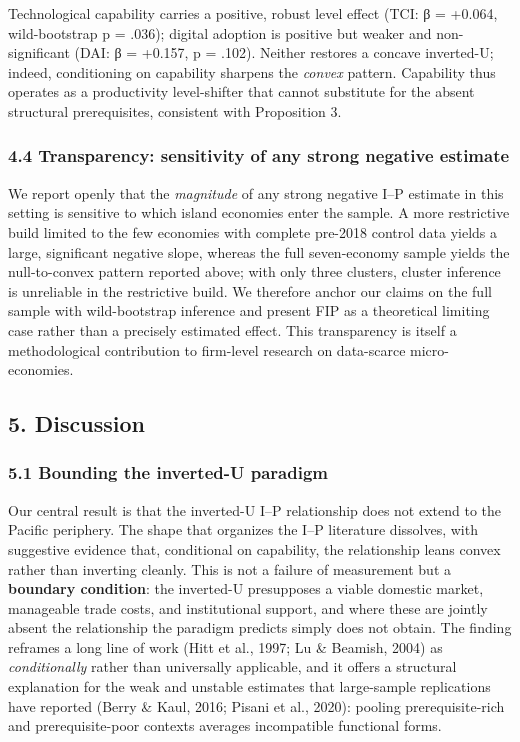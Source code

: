 \documentclass[
  12pt,a4paper]{article}
\begin{document}
Technological capability carries a positive, robust level effect (TCI: β
= +0.064, wild-bootstrap p = .036); digital adoption is positive but
weaker and non-significant (DAI: β = +0.157, p = .102). Neither restores
a concave inverted-U; indeed, conditioning on capability sharpens the
\emph{convex} pattern. Capability thus operates as a productivity
level-shifter that cannot substitute for the absent structural
prerequisites, consistent with Proposition 3.

\hypertarget{transparency-sensitivity-of-any-strong-negative-estimate}{%
\subsubsection{4.4 Transparency: sensitivity of any strong negative
estimate}\label{transparency-sensitivity-of-any-strong-negative-estimate}}

We report openly that the \emph{magnitude} of any strong negative I--P
estimate in this setting is sensitive to which island economies enter
the sample. A more restrictive build limited to the few economies with
complete pre-2018 control data yields a large, significant negative
slope, whereas the full seven-economy sample yields the null-to-convex
pattern reported above; with only three clusters, cluster inference is
unreliable in the restrictive build. We therefore anchor our claims on
the full sample with wild-bootstrap inference and present FIP as a
theoretical limiting case rather than a precisely estimated effect. This
transparency is itself a methodological contribution to firm-level
research on data-scarce micro-economies.

\hypertarget{discussion}{%
\subsection{5. Discussion}\label{discussion}}

\hypertarget{bounding-the-inverted-u-paradigm}{%
\subsubsection{5.1 Bounding the inverted-U
paradigm}\label{bounding-the-inverted-u-paradigm}}

Our central result is that the inverted-U I--P relationship does not
extend to the Pacific periphery. The shape that organizes the I--P
literature dissolves, with suggestive evidence that, conditional on
capability, the relationship leans convex rather than inverting
cleanly. This is not a failure of measurement but a \textbf{boundary
condition}: the inverted-U presupposes a viable domestic market,
manageable trade costs, and institutional support, and where these are
jointly absent the relationship the paradigm predicts simply does not
obtain. The finding reframes a long line of work (Hitt et al., 1997; Lu
\& Beamish, 2004) as \emph{conditionally} rather than universally
applicable, and it offers a structural explanation for the weak and
unstable estimates that large-sample replications have reported (Berry
\& Kaul, 2016; Pisani et al., 2020): pooling prerequisite-rich and
prerequisite-poor contexts averages incompatible functional forms.
\end{document}
